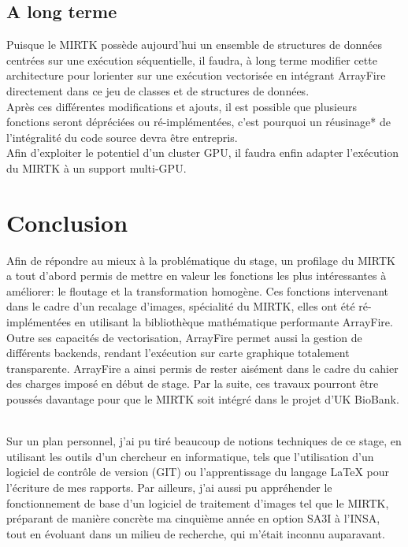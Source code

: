 \documentclass[10pt]{report}
\begin{document}
	\section{A long terme}
	Puisque le MIRTK possède aujourd'hui un ensemble de structures de données centrées sur une exécution séquentielle, il faudra, à long terme modifier cette architecture pour lorienter sur une exécution vectorisée en intégrant ArrayFire directement dans ce jeu de classes et de structures de données.\\
	Après ces différentes modifications et ajouts, il est possible que plusieurs fonctions seront dépréciées ou ré-implémentées, c'est pourquoi un réusinage* de l'intégralité du code source devra être entrepris.\\  
	Afin d'exploiter le potentiel d'un cluster GPU, il faudra enfin adapter l'exécution du MIRTK à un support multi-GPU.  

\chapter*{Conclusion} 
Afin de répondre au mieux à la problématique du stage, un profilage du MIRTK a tout d'abord permis de mettre en valeur les fonctions les plus intéressantes à améliorer: le floutage et la transformation homogène. Ces fonctions intervenant dans le cadre d'un recalage d'images, spécialité du MIRTK, elles ont été ré-implémentées en utilisant la bibliothèque mathématique performante ArrayFire. Outre ses capacités de vectorisation, ArrayFire permet aussi la gestion de différents backends, rendant l'exécution sur carte graphique totalement transparente. ArrayFire a ainsi permis de rester aisément dans le cadre du cahier des charges imposé en début de stage. Par la suite, ces travaux pourront être poussés davantage pour que le MIRTK soit intégré dans le projet d'UK BioBank.\\ ~\par
\noindent
Sur un plan personnel, j'ai pu tiré beaucoup de notions techniques de ce stage, en utilisant les outils d'un chercheur en informatique, tels que l'utilisation d'un logiciel de contrôle de version (GIT) ou l'apprentissage du langage LaTeX pour l'écriture de mes rapports. Par ailleurs, j'ai aussi pu appréhender le fonctionnement de base d'un logiciel de traitement d'images tel que le MIRTK, préparant de manière concrète ma cinquième année en option SA3I à l'INSA, tout en évoluant dans un milieu de recherche, qui m'était inconnu auparavant.
\end{document}
